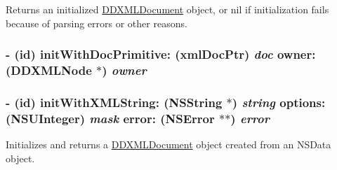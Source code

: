 Returns an initialized \hyperlink{interface_d_d_x_m_l_document}{DDXMLDocument} object, or nil if initialization fails because of parsing errors or other reasons. \hypertarget{interface_d_d_x_m_l_document_aaeed7c9531d8f43583b680d8ca69bf3e}{
\subsubsection[{initWithDocPrimitive:owner:}]{\setlength{\rightskip}{0pt plus 5cm}-\/ (id) initWithDocPrimitive: (xmlDocPtr) {\em doc}\/ owner: ({\bf DDXMLNode} $\ast$) {\em owner}}}
\label{interface_d_d_x_m_l_document_aaeed7c9531d8f43583b680d8ca69bf3e}
\hypertarget{interface_d_d_x_m_l_document_af23d56200d9ee753e86ce0b7cb55c39a}{
\subsubsection[{initWithXMLString:options:error:}]{\setlength{\rightskip}{0pt plus 5cm}-\/ (id) initWithXMLString: ({\bf NSString} $\ast$) {\em string}\/ options: (NSUInteger) {\em mask}\/ error: (NSError $\ast$$\ast$) {\em error}}}
\label{interface_d_d_x_m_l_document_af23d56200d9ee753e86ce0b7cb55c39a}
Initializes and returns a \hyperlink{interface_d_d_x_m_l_document}{DDXMLDocument} object created from an NSData object.

